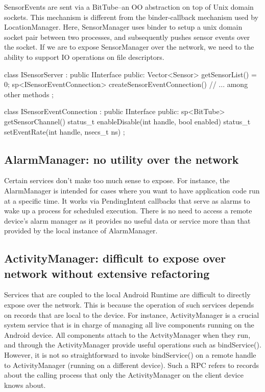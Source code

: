 \documentclass[prodmode]{acmlarge}
\begin{document}
SensorEvents are sent via a BitTube--an OO abstraction on top of Unix domain sockets. This mechanism is different from the binder-callback mechanism used by LocationManager. Here, SensorManager uses binder to setup a unix domain socket pair between two processes, and subsequently pushes sensor events over the socket. If we are to expose SensorManager over the network, we need to the ability to support IO operations on file descriptors.

\begin{snippet}
class ISensorServer : public IInterface {
public:
    Vector<Sensor> getSensorList() = 0;
    sp<ISensorEventConnection>
      createSensorEventConnection()
    // ... among other methods
};
\end{snippet}

\begin{snippet}
class ISensorEventConnection : public IInterface {
public:
    sp<BitTube> getSensorChannel()
    status_t enableDisable(int handle, bool enabled)
    status_t setEventRate(int handle, nsecs_t ns)
};
\end{snippet}

\subsection{AlarmManager: no utility over the network}
Certain services don't make too much sense to expose. For instance, the AlarmManager is intended for cases where you want to have application code run at a specific time. It works via PendingIntent callbacks that serve as alarms to wake up a process for scheduled execution. There is no need to access a remote device's alarm manager as it provides no useful data or service more than that provided by the local instance of AlarmManager.

\subsection{ActivityManager: difficult to expose over network without extensive refactoring}
Services that are coupled to the local Android Runtime are difficult to directly expose over the network. This is because the operation of such services depends on records that are local to the device. For instance, ActivityManager is a crucial system service that is in charge of managing all live components running on the Android device. All components attach to the ActvityManager when they run, and through the ActivityManager provide useful operations such as bindService(). However, it is not so straightforward to invoke bindService() on a remote handle to ActivityManager (running on a different device). Such a RPC refers to records about the calling process that only the ActivityManager on the client device knows about.
\end{document}
